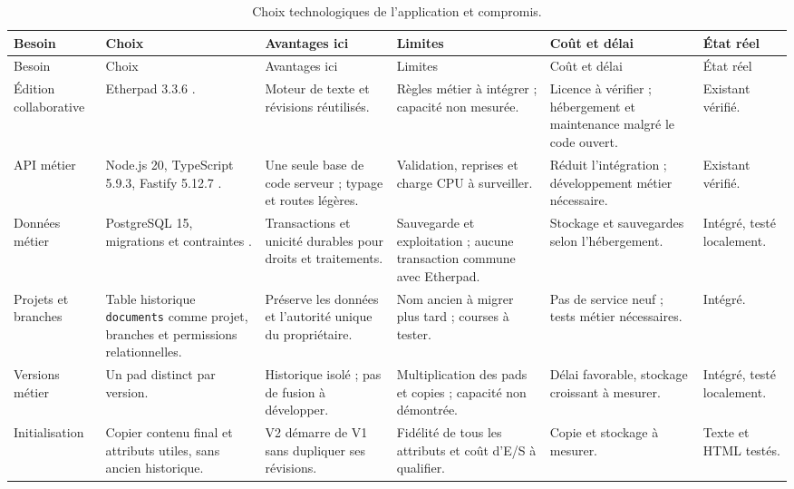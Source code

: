 \begingroup\small\sloppy
\begin{longtable}{@{}L{21mm}@{\hspace{1mm}}L{28mm}@{\hspace{1mm}}L{29mm}@{\hspace{1mm}}L{27mm}@{\hspace{1mm}}L{24mm}@{\hspace{1mm}}L{17mm}@{}}
\caption{Choix technologiques de l'application et compromis.}\label{tab:stack}\\
\toprule
Besoin & Choix & Avantages ici & Limites & Coût et délai & État réel \\
\midrule
\endfirsthead
\toprule
Besoin & Choix & Avantages ici & Limites & Coût et délai & État réel \\
\midrule
\endhead
Édition collaborative & Etherpad 3.3.6 \cite{etherpad-release}. & Moteur de texte et révisions réutilisés. & Règles métier à intégrer ; capacité non mesurée. & Licence à vérifier ; hébergement et maintenance malgré le code ouvert. & Existant vérifié. \\
\addlinespace
API métier & Node.js 20, TypeScript 5.9.3, Fastify 5.12.7 \cite{fastify}. & Une seule base de code serveur ; typage et routes légères. & Validation, reprises et charge CPU à surveiller. & Réduit l'intégration ; développement métier nécessaire. & Existant vérifié. \\
\addlinespace
Données métier & PostgreSQL 15, migrations et contraintes \cite{postgres-doc}. & Transactions et unicité durables pour droits et traitements. & Sauvegarde et exploitation ; aucune transaction commune avec Etherpad. & Stockage et sauvegardes selon l'hébergement. & Intégré, testé localement. \\
\addlinespace
Projets et branches & Table historique \texttt{documents} comme projet, branches et permissions relationnelles. & Préserve les données et l'autorité unique du propriétaire. & Nom ancien à migrer plus tard ; courses à tester. & Pas de service neuf ; tests métier nécessaires. & Intégré. \\
\addlinespace
Versions métier & Un pad distinct par version. & Historique isolé ; pas de fusion à développer. & Multiplication des pads et copies ; capacité non démontrée. & Délai favorable, stockage croissant à mesurer. & Intégré, testé localement. \\
\addlinespace
Initialisation & Copier contenu final et attributs utiles, sans ancien historique. & V2 démarre de V1 sans dupliquer ses révisions. & Fidélité de tous les attributs et coût d'E/S à qualifier. & Copie et stockage à mesurer. & Texte et HTML testés. \\

\end{longtable}
